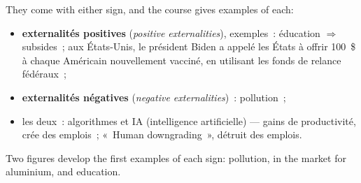 They come with either sign, and the course gives examples of each:
\begin{itemize}
  \item \textbf{externalités positives} (\textit{positive externalities}),
    exemples~: éducation $\Longrightarrow$ subsides~; aux États-Unis, le président
    Biden a appelé les États à offrir 100~\$ à chaque Américain nouvellement
    vacciné, en utilisant les fonds de relance fédéraux~;
  \item \textbf{externalités négatives} (\textit{negative externalities})~:
    pollution~;
  \item les deux~: algorithmes et IA (intelligence artificielle) --- gains de
    productivité, crée des emplois~; «~Human downgrading~», détruit des emplois.
\end{itemize}
Two figures develop the first examples of each sign: pollution, in the market for
aluminium, and education.


